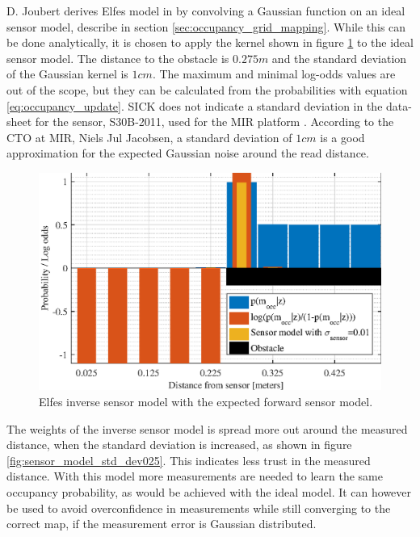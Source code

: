 D. Joubert derives Elfes model in \cite{Joubert2014} by convolving a Gaussian function on an ideal sensor model, describe in section \vref{sec:occupancy_grid_mapping}. While this can be done analytically, it is chosen to apply the kernel shown in figure \ref{fig:sensor_model_std_dev01} to the ideal sensor model.
The distance to the obstacle is $0.275m$ and the standard deviation of the Gaussian kernel is $1cm$. 
The maximum and minimal log-odds values are out of the scope, but they can be calculated from the probabilities with equation \ref{eq:occupancy_update}.
SICK does not indicate a standard deviation in the data-sheet for the sensor, S30B-2011, used for the MIR platform \cite{lidarDatasheet}.
According to the CTO at MIR, Niels Jul Jacobsen, a standard deviation of $1cm$ is a good approximation for the expected Gaussian noise around the read distance. 

\begin{figure}
	\centering
	\includegraphics[scale=1.0]{figures/static_mapping/sensor_model_std_dev01}
	\caption{Elfes inverse sensor model with the expected forward sensor model.}
	\label{fig:sensor_model_std_dev01}
\end{figure}

The weights of the inverse sensor model is spread more out around the measured distance, when the standard deviation is increased, as shown in figure \ref{fig:sensor_model_std_dev025}. 
This indicates less trust in the measured distance. With this model more measurements are needed to learn the same occupancy probability, as would be achieved with the ideal model. It can however be used to avoid overconfidence in measurements while still converging to the correct map, if the measurement error is Gaussian distributed.

